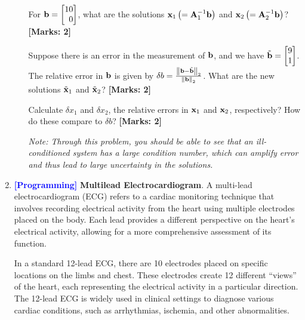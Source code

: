 \documentclass[12pt]{article}
\def\mf{\ensuremath\mathbf}
\def\lp{\ensuremath\left(}
\def\rp{\ensuremath\right)}
\def\lV{\ensuremath\left\lVert}
\def\rV{\ensuremath\right\rVert}
\def\bmx{\ensuremath\begin{bmatrix*}[r]}
\def\emx{\ensuremath\end{bmatrix*}}
\begin{document}
\begin{enumerate}
\begin{enumerate}
        For $\mf{b} = \bmx 10 \\ 0\emx$, what are the solutions $\mf{x}_1\lp=\mf{A}_1^{-1}\mf{b}\rp$ and $\mf{x}_2\lp=\mf{A}_2^{-1}\mf{b}\rp$?  \textbf{[Marks: 2]}

        Suppose there is an error in the measurement of $\mf{b}$, and we have $\tilde{\mf{b}} = \bmx 9 \\ 1\emx$. The relative error in $\mf{b}$ is given by $\delta b = \frac{\lV \mf{b} - \tilde{\mf{b}}\rV_2}{\lV\mf{b}\rV_2}$. What are the new solutions $\tilde{\mf{x}}_1$ and $\tilde{\mf{x}}_2$? \textbf{[Marks: 2]}

        Calculate $\delta x_1$ and $\delta x_2$, the relative errors in $\mf{x}_1$ and $\mf{x}_2$, respectively? How do these compare to $\delta b$? \textbf{[Marks: 2]}

        \textit{Note: Through this problem, you should be able to see that an ill-conditioned system has a large condition number, which can amplify error and thus lead to large uncertainty in the solutions.}
    \end{enumerate}

    \item \textcolor{blue}{\textbf{[Programming]}} \textbf{Multilead Electrocardiogram}. A multi-lead electrocardiogram (ECG) refers to a cardiac monitoring technique that involves recording electrical activity from the heart using multiple electrodes placed on the body. Each lead provides a different perspective on the heart's electrical activity, allowing for a more comprehensive assessment of its function.

    In a standard 12-lead ECG, there are 10 electrodes placed on specific locations on the limbs and chest. These electrodes create 12 different ``views'' of the heart, each representing the electrical activity in a particular direction. The 12-lead ECG is widely used in clinical settings to diagnose various cardiac conditions, such as arrhythmias, ischemia, and other abnormalities.
    

\end{enumerate}
\end{document}
